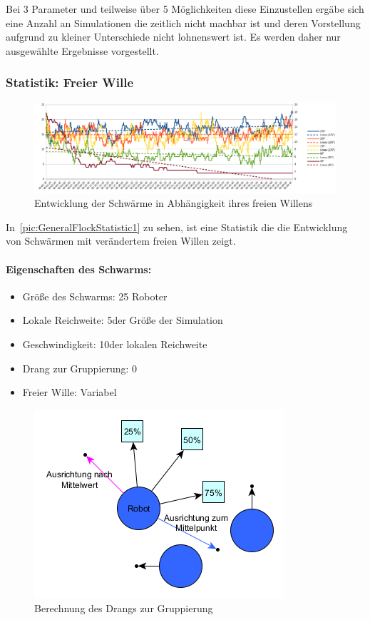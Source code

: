 Bei 3 Parameter und teilweise über 5 Möglichkeiten diese Einzustellen ergäbe sich eine Anzahl an Simulationen die zeitlich nicht machbar ist und deren Vorstellung aufgrund zu kleiner Unterschiede nicht lohnenswert ist. Es werden daher nur ausgewählte Ergebnisse vorgestellt.

\subsubsection*{Statistik: Freier Wille}\label{subsubsec:StatistikFreierWille}

\begin{figure}
	\includegraphics[width=\textwidth,height=\statisticHeight]{graphics/Statistics/FlockGeneral/LocalRange1Speed01ToFlock0.png}
	\caption{Entwicklung der Schwärme in Abhängigkeit ihres freien Willens}
	\label{pic:GeneralFlockStatistic1}
\end{figure}

In~\autoref{pic:GeneralFlockStatistic1} zu sehen, ist eine Statistik die die Entwicklung von Schwärmen mit verändertem freien Willen zeigt.

\paragraph*{Eigenschaften des Schwarms:}
\begin{itemize}
	\item Größe des Schwarms: 25 Roboter
	\item Lokale Reichweite: 5\per der Größe der Simulation
	\item Geschwindigkeit: 10\per der lokalen Reichweite
	\item Drang zur Gruppierung: 0\per
	\item Freier Wille: Variabel
\end{itemize}

\begin{figure}
	\includegraphics[width=\pictureWidth,keepaspectratio]{graphics/BerechnungDrangZurGruppe.png}
	\caption{Berechnung des Drangs zur Gruppierung}
	\label{pic:BerechnungDrangZurGruppe}
\end{figure}

